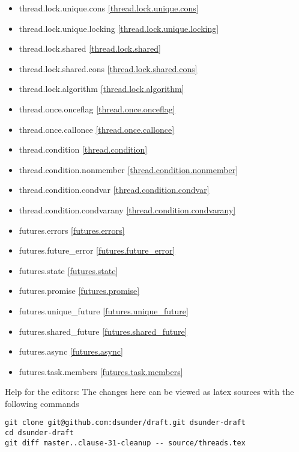 \begin{multicols}{2}
\begin{itemize}
\item{thread.lock.unique.cons               \ref{thread.lock.unique.cons}}
\item{thread.lock.unique.locking            \ref{thread.lock.unique.locking}}
\item{thread.lock.shared                    \ref{thread.lock.shared}}
\item{thread.lock.shared.cons               \ref{thread.lock.shared.cons}}
\item{thread.lock.algorithm                 \ref{thread.lock.algorithm}}
\item{thread.once.onceflag                  \ref{thread.once.onceflag}}
\item{thread.once.callonce                  \ref{thread.once.callonce}}
\item{thread.condition                      \ref{thread.condition}}
\item{thread.condition.nonmember            \ref{thread.condition.nonmember}}
\item{thread.condition.condvar              \ref{thread.condition.condvar}}
\item{thread.condition.condvarany           \ref{thread.condition.condvarany}}
\item{futures.errors                        \ref{futures.errors}}
\item{futures.future_error                  \ref{futures.future_error}}
\item{futures.state                         \ref{futures.state}}
\item{futures.promise                       \ref{futures.promise}}
\item{futures.unique_future                 \ref{futures.unique_future}}
\item{futures.shared_future                 \ref{futures.shared_future}}
\item{futures.async                         \ref{futures.async}}
\item{futures.task.members                  \ref{futures.task.members}}

\end{itemize}
\end{multicols}


\vfill
Help for the editors: The changes here can be viewed as latex sources with the following commands
\begin{verbatim}
git clone git@github.com:dsunder/draft.git dsunder-draft
cd dsunder-draft
git diff master..clause-31-cleanup -- source/threads.tex
\end{verbatim}
\newpage
